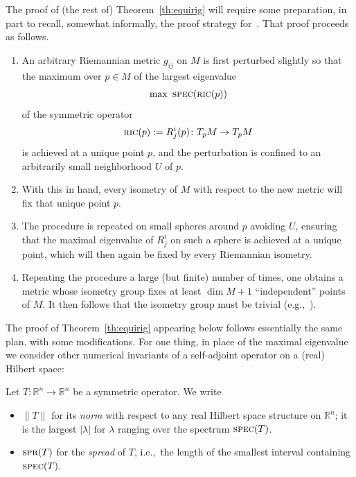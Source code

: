 \documentclass[10pt,a4paper]{amsart}
\numberwithin{equation}{section}
\newcommand{\cat}[1]{\textsc{#1}}
\begin{document}
The proof of (the rest of) Theorem~\ref{th:equirig} will require some preparation, in part to recall, somewhat informally, the proof strategy for~\cite[Proposition~8.3]{eb}. That proof proceeds as follows.

\begin{enumerate}[$(a)$]\itemsep=0pt
\item%
An arbitrary Riemannian metric $g_{ij}$ on $M$ is first perturbed slightly so that the maximum over $p\in M$ of the largest eigenvalue
 \begin{gather*}
 \max~\cat{spec}(\cat{ric}(p))
 \end{gather*}
 of the symmetric operator
 \begin{gather*}
 \cat{ric}(p):=R^i_j(p)\colon T_pM\to T_pM
 \end{gather*}
 is achieved at a unique point $p$, and the perturbation is confined to an arbitrarily small neighborhood $U$ of $p$.
\item%
With this in hand, every isometry of $M$ with respect to the new metric will fix that unique point $p$.
\item%
The procedure is repeated on small spheres around $p$ avoiding $U$, ensuring that the maximal eigenvalue of $R^i_j$ on such a sphere is achieved at a unique point, which will then again be fixed by every Riemannian isometry.
\item%
Repeating the procedure a large (but finite) number of times, one obtains a metric whose isometry group fixes at least $\dim M+1$ ``independent'' points of $M$. It then follows that the isometry group must be trivial (e.g.,~\cite[Theorem~3]{ms}).
\end{enumerate}

The proof of Theorem~\ref{th:equirig} appearing below follows essentially the same plan, with some modifications. For one thing, in place of the maximal eigenvalue we consider other numerical invariants of a self-adjoint operator on a (real) Hilbert space:

\begin{Notation}%
 Let $T\colon \mathbb{R}^n\to \mathbb{R}^n$ be a symmetric operator. We write
 \begin{itemize}\itemsep=0pt
 \item $\|T\|$ for its {\it norm} with respect to any real Hilbert space structure on $\mathbb{R}^n$; it is the largest $|\lambda|$ for $\lambda$ ranging over the spectrum $\cat{spec}(T)$.
 \item $\cat{spr}(T)$ for the {\it spread} of $T$, i.e.,~the length of the smallest interval containing $\cat{spec}(T)$.
 \end{itemize}
\end{Notation}
\end{document}

